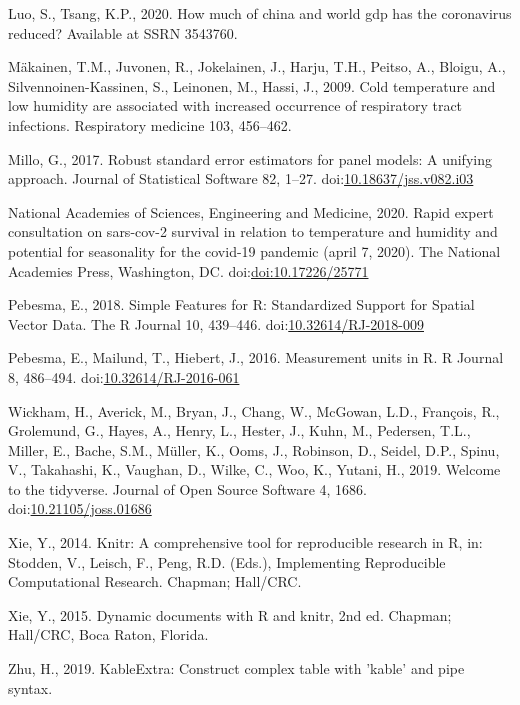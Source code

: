 \documentclass[]{elsarticle} %
\begin{document}
\leavevmode\hypertarget{ref-Luo2020how}{}%
Luo, S., Tsang, K.P., 2020. How much of china and world gdp has the
coronavirus reduced? Available at SSRN 3543760.

\leavevmode\hypertarget{ref-Makinen2009cold}{}%
Mäkainen, T.M., Juvonen, R., Jokelainen, J., Harju, T.H., Peitso, A.,
Bloigu, A., Silvennoinen-Kassinen, S., Leinonen, M., Hassi, J., 2009.
Cold temperature and low humidity are associated with increased
occurrence of respiratory tract infections. Respiratory medicine 103,
456--462.

\leavevmode\hypertarget{ref-Millo2017robust}{}%
Millo, G., 2017. Robust standard error estimators for panel models: A
unifying approach. Journal of Statistical Software 82, 1--27.
doi:\href{https://doi.org/10.18637/jss.v082.i03}{10.18637/jss.v082.i03}

\leavevmode\hypertarget{ref-National2020rapid}{}%
National Academies of Sciences, Engineering and Medicine, 2020. Rapid
expert consultation on sars-cov-2 survival in relation to temperature
and humidity and potential for seasonality for the covid-19 pandemic
(april 7, 2020). The National Academies Press, Washington, DC.
doi:\href{https://doi.org/doi:10.17226/25771}{doi:10.17226/25771}

\leavevmode\hypertarget{ref-Pebesma2018}{}%
Pebesma, E., 2018. Simple Features for R: Standardized Support for
Spatial Vector Data. The R Journal 10, 439--446.
doi:\href{https://doi.org/10.32614/RJ-2018-009}{10.32614/RJ-2018-009}

\leavevmode\hypertarget{ref-Pebesma2016}{}%
Pebesma, E., Mailund, T., Hiebert, J., 2016. Measurement units in R. R
Journal 8, 486--494.
doi:\href{https://doi.org/10.32614/RJ-2016-061}{10.32614/RJ-2016-061}

\leavevmode\hypertarget{ref-Wickham2019}{}%
Wickham, H., Averick, M., Bryan, J., Chang, W., McGowan, L.D., François,
R., Grolemund, G., Hayes, A., Henry, L., Hester, J., Kuhn, M., Pedersen,
T.L., Miller, E., Bache, S.M., Müller, K., Ooms, J., Robinson, D.,
Seidel, D.P., Spinu, V., Takahashi, K., Vaughan, D., Wilke, C., Woo, K.,
Yutani, H., 2019. Welcome to the tidyverse. Journal of Open Source
Software 4, 1686.
doi:\href{https://doi.org/10.21105/joss.01686}{10.21105/joss.01686}

\leavevmode\hypertarget{ref-Xie2014}{}%
Xie, Y., 2014. Knitr: A comprehensive tool for reproducible research in
R, in: Stodden, V., Leisch, F., Peng, R.D. (Eds.), Implementing
Reproducible Computational Research. Chapman; Hall/CRC.

\leavevmode\hypertarget{ref-Xie2015}{}%
Xie, Y., 2015. Dynamic documents with R and knitr, 2nd ed. Chapman;
Hall/CRC, Boca Raton, Florida.

\leavevmode\hypertarget{ref-Zhu2019}{}%
Zhu, H., 2019. KableExtra: Construct complex table with 'kable' and pipe
syntax.
\end{document}
